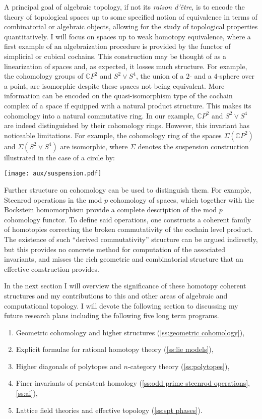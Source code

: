 A principal goal of algebraic topology, if not its \emph{raison d'\^{e}tre}, is to encode the theory of topological spaces up to some specified notion of equivalence in terms of combinatorial or algebraic objects, allowing for the study of topological properties quantitatively.
I will focus on spaces up to weak homotopy equivalence, where a first example of an algebraization procedure is provided by the functor of simplicial or cubical cochains.
This construction may be thought of as a linearization of spaces and, as expected, it losses much structure.
For example, the cohomology groups of $\mathbb{C} P^2$ and $S^2 \vee S^4$, the union of a $2$- and a $4$-sphere over a point, are isomorphic despite these spaces not being equivalent.
More information can be encoded on the quasi-isomorphism type of the cochain complex of a space if equipped with a natural product structure.
This makes its cohomology into a natural commutative ring.
In our example, $\mathbb{C} P^2$ and $S^2 \vee S^4$ are indeed distinguished by their cohomology rings.
However, this invariant has noticeable limitations.
For example, the cohomology ring of the spaces $\Sigma(\mathbb{C} P^2)$ and $\Sigma(S^2 \vee S^4)$ are isomorphic, where $\Sigma$ denotes the suspension construction illustrated in the case of a circle by:
\begin{center}
	\texttt{[image: aux/suspension.pdf]}
\end{center}
Further structure on cohomology can be used to distinguish them.
For example, Steenrod operations in the mod $p$ cohomology of spaces, which together with the Bockstein homomorphism provide a complete description of the mod $p$ cohomology functor.
To define said operations, one constructs a coherent family of homotopies correcting the broken commutativity of the cochain level product.
The existence of such ``derived commutativity'' structure can be argued indirectly, but this provides no concrete method for computation of the associated invariants, and misses the rich geometric and combinatorial structure that an effective construction provides.

In the next section I will overview the significance of these homotopy coherent structures and my contributions to this and other areas of algebraic and computational topology.
I will devote the following section to discussing my future research plans including the following five long term programs.

\begin{enumerate}
	\item Geometric cohomology and higher structures (\cref{ss:geometric cohomology}),
	\item Explicit formulae for rational homotopy theory (\cref{ss:lie models}),
	\item Higher diagonals of polytopes and $n$-category theory (\cref{ss:polytopes}),
	\item Finer invariants of persistent homology (\cref{ss:odd prime steenrod operations}, \cref{ss:ai}),
	\item Lattice field theories and effective topology (\cref{ss:spt phases}).
\end{enumerate}
